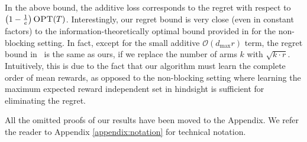 In the above bound, the additive loss corresponds to the regret with respect to $\left(1 - \frac{1}{e}\right)\textsc{OPT}(T)$. Interestingly, our regret bound is very close (even in constant factors) to the information-theoretically optimal bound provided in \cite{KWAEE14} for the non-blocking setting. In fact, except for the small additive $\mathcal{O}(d_{\max}r)$ term, the regret bound in~\cite{KWAEE14} is the same as ours, if we replace the number of arms $k$ with $\sqrt{k\cdot r}$. Intuitively, this is due to the fact that our algorithm must learn the complete order of mean rewards, as opposed to the non-blocking setting where learning the maximum expected reward independent set in hindsight is sufficient for eliminating the regret.


All the omitted proofs of our results have been moved to the Appendix. We refer the reader to Appendix \ref{appendix:notation} for technical notation.